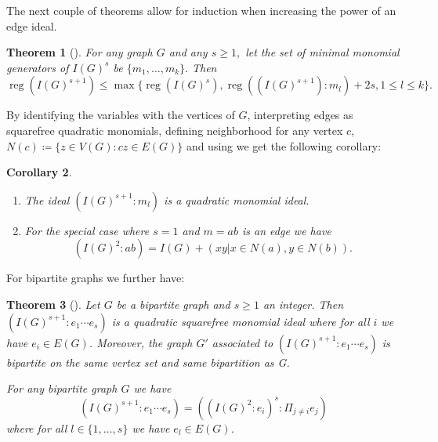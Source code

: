 \documentclass[10pt]{article}
\newtheorem{theorem}{Theorem}[section]
\newtheorem{coro}[theorem]{Corollary}
\theoremstyle{definition}
\numberwithin{equation}{section}
\newcommand \reg{\operatorname{reg}}
\begin{document}
 The next couple of theorems allow for induction when increasing the power of an edge ideal.
 
\begin{theorem}[{\cite[Thm. 5.2]{banerjee}}]
\label{thm:2.3}
For any graph $G$ and any $s \geq 1,$ let the set of minimal monomial generators of $I(G)^s$ be $\{m_1, \dots, m_k\}.$ Then
$$ \reg (I(G)^{s+1}) \leq \max \{\reg (I(G)^s) , \reg ((I(G)^{s+1}): m_l)+2s , 1 \leq l \leq k\}.$$
\end{theorem}

 By identifying the variables with the vertices of $G$, interpreting edges as squarefree quadratic monomials, defining neighborhood for any vertex $c$,  $N(c)\coloneqq\{z\in V(G): cz \in E(G)\}$ and using  \cite[Thm. 5.2]{banerjee}  we get the following corollary:

\begin{coro}
\begin{enumerate}[label=(\roman*)]
\item The ideal $(I(G)^{s+1}: m_l)$ is a quadratic monomial ideal.
\item For the special case where $s=1$ and $m=ab$ is an edge we have $$(I(G)^2:ab)=I(G)+(xy| x\in N(a),y\in N(b)).$$
\end{enumerate}
\label{cor:I2:e}
\end{coro}

 For bipartite graphs we further have:
\begin{theorem}[{\cite[Lem. 3.2, Prop. 3.4]{banerjee1}}]
Let $G$ be a bipartite graph and $s \geq 1$ an integer. 
Then $(I(G)^{s+1}: e_1 \cdots e_s)$ is a quadratic squarefree monomial ideal where for all $i$ we have $e_i \in E(G)$. Moreover, the graph $G'$ associated to $(I(G)^{s+1} : e_1\cdots e_s)$ is bipartite on the same vertex set and same bipartition as G.

 For any bipartite graph $G$ we have $$(I(G)^{s+1}:e_1\cdots e_s)=((I(G)^2:e_i)^s : \Pi_{j \neq i} e_j)$$ where for all $l \in \{1, \ldots,s\}$ we have $e_l \in E(G)$.
 \label{thm:2.5}
\end{theorem}
\end{document}
